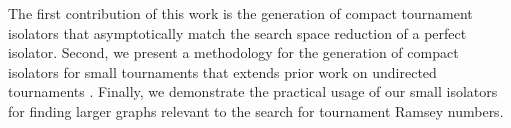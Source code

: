 \documentclass[conference]{IEEEtran}
\newcommand{\N}{\mathbb{N}}
\begin{document}
The first contribution of this work is the generation of compact tournament isolators that asymptotically match the search space reduction of a perfect isolator. Second, we present a methodology for the generation of compact isolators for small tournaments that extends prior work on undirected tournaments \cite{ref_heule}.  Finally, we demonstrate the practical usage of our small isolators for finding larger graphs relevant to the search for tournament Ramsey numbers.





\end{document}

